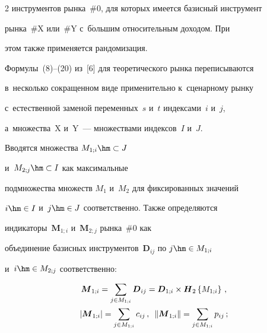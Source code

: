 \begin{multicols}{2}
инструментов рынка~\#0, для которых имеется базисный инструмент 


рынка~\#X или~\#Y с~б$\acute{\mbox{о}}$льшим относительным доходом. При 


этом также применяется рандомизация. 


  


  Формулы~(8)--(20) из~[6] для теоретического рынка переписываются 


в~несколько сокращенном виде применительно к~сценарному рынку 


с~естественной заменой переменных~$s$ и~$t$ индексами~$i$ и~$j$, 


а~множества~{\sf X} и~{\sf Y}~--- множествами индексов~$I$ и~$J$. 


  


  Вводятся множества $M_{1;i}\hm\subset J$ 


  и~$M_{2;j}\hm\subset I$ как максимальные 


подмножества множеств $M_1$ и~$M_2$ для фиксированных значений 


$i\hm\in I$ и~$j \hm\in J$ соответственно. Также определяются 


индикаторы~$\boldsymbol{M}_{1;i}$ и~$\boldsymbol{M}_{2;j}$ рынка~\#0 как 


объединение базисных инструментов~$\boldsymbol{D}_{ij}$ по $j \hm\in M_{1;i}$ 


и~$i\hm\in M_{2;j}$ соответственно: 


  \begin{multline}


   \boldsymbol{M}_{1;i}= \sum\limits_{j\in 


M_{1;i}}\boldsymbol{D}_{ij}=\boldsymbol{D}_{1;i}\times 


\boldsymbol{H}_2\left\{ M_{1;i}\right\}\,,\\


  \left\vert \boldsymbol{M}_{1;i}\right\vert = \sum\limits_{j\in M_{1;i}} 


c_{ij}\,,\enskip  \left\| \boldsymbol{M}_{1;i}\right\| =\sum\limits_{j\in M_{1;i}} 


p_{ij}\,;


  \label{e9-ags}


\end{multline}





\noindent



\end{multicols}

